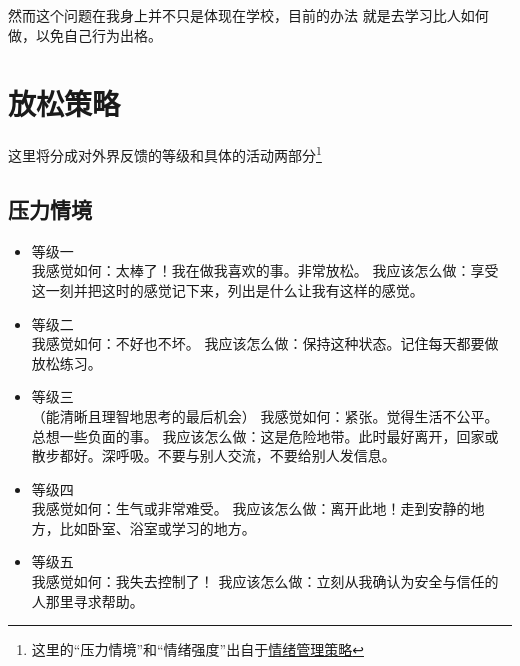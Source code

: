 \documentclass{assignment}
\begin{document}
\begin{problem}
\begin{itemize}
            然而这个问题在我身上并不只是体现在学校，目前的办法
            就是去学习比人如何做，以免自己行为出格。
    \end{itemize}

\section{放松策略}
\noindent 这里将分成对外界反馈的等级和具体的活动两部分\footnote[2]{这里的“压力情境”和“情绪强度”出自于\href{https://zhuanlan.zhihu.com/p/466825383?utm_psn=1717710121701052416}{情绪管理策略}}
\subsection{压力情境}
\begin{itemize}
    \item 等级一\\
    我感觉如何：太棒了！我在做我喜欢的事。非常放松。
    我应该怎么做：享受这一刻并把这时的感觉记下来，列出是什么让我有这样的感觉。
    \item 等级二\\
    我感觉如何：不好也不坏。
    我应该怎么做：保持这种状态。记住每天都要做放松练习。
    \item 等级三\\（能清晰且理智地思考的最后机会）
    我感觉如何：紧张。觉得生活不公平。总想一些负面的事。
    我应该怎么做：这是危险地带。此时最好离开，回家或散步都好。深呼吸。不要与别人交流，不要给别人发信息。
    \item 等级四\\
    我感觉如何：生气或非常难受。
    我应该怎么做：离开此地！走到安静的地方，比如卧室、浴室或学习的地方。
    \item 等级五\\
    我感觉如何：我失去控制了！
    我应该怎么做：立刻从我确认为安全与信任的人那里寻求帮助。    
\end{itemize}


\end{problem}
\end{document}
